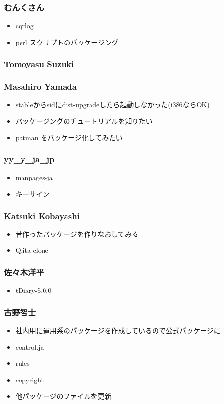 \documentclass[cjk,dvipdfmx,10pt,compress,%
hyperref={bookmarks=true,bookmarksnumbered=true,bookmarksopen=false,%
colorlinks=false,%
pdftitle={第 111 回 関西 Debian 勉強会},%
pdfauthor={倉敷・のがた・佐々木・かわだ},%
pdfsubject={資料},%
}]{beamer}
\begin{document}
\begin{frame}
  \frametitle{ むんくさん }
  \begin{itemize}
  \item cqrlog
  \item perl スクリプトのパッケージング
  \end{itemize}
\end{frame}

\begin{frame}
  \frametitle{ Tomoyasu Suzuki }
\end{frame}

\begin{frame}
  \frametitle{ Masahiro Yamada }
  \begin{itemize}
  \item stableからsidにdist-upgradeしたら起動しなかった(i386ならOK)
  \item パッケージングのチュートリアルを知りたい
  \item patman をパッケージ化してみたい
  \end{itemize}
\end{frame}

\begin{frame}
  \frametitle{ yy\_y\_ja\_jp }
  \begin{itemize}
  \item manpages-ja
  \item キーサイン
  \end{itemize}
\end{frame}

\begin{frame}
  \frametitle{ Katsuki Kobayashi }
  \begin{itemize}
  \item 昔作ったパッケージを作りなおしてみる
  \item Qiita clone
  \end{itemize}
\end{frame}

\begin{frame}
  \frametitle{ 佐々木洋平 }
  \begin{itemize}
  \item tDiary-5.0.0
  \end{itemize}
\end{frame}

\begin{frame}
  \frametitle{ 古野智士 }
  \begin{itemize}
  \item 社内用に運用系のパッケージを作成しているので公式パッケージに
  \item control.ja
  \item rules
  \item copyright
  \item 他パッケージのファイルを更新
  \end{itemize}
\end{frame}
\end{document}
